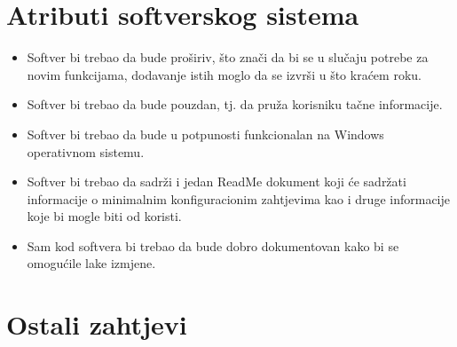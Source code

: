 \section{Atributi softverskog sistema}
\begin{itemize}
\item Softver bi trebao da bude proširiv, što znači da bi se u slučaju potrebe za novim funkcijama, dodavanje 
istih moglo da se izvrši u što kraćem roku.
\item Softver bi trebao da bude pouzdan, tj. da pruža korisniku tačne informacije.
\item Softver bi trebao da bude u potpunosti funkcionalan na Windows operativnom sistemu.
\item Softver bi trebao da sadrži i jedan ReadMe dokument koji će sadržati informacije o minimalnim konfiguracionim 
zahtjevima kao i druge informacije koje bi mogle biti od koristi.
\item Sam kod softvera bi trebao da bude dobro dokumentovan kako bi se omogućile lake izmjene.
\end{itemize}

\section{Ostali zahtjevi}
